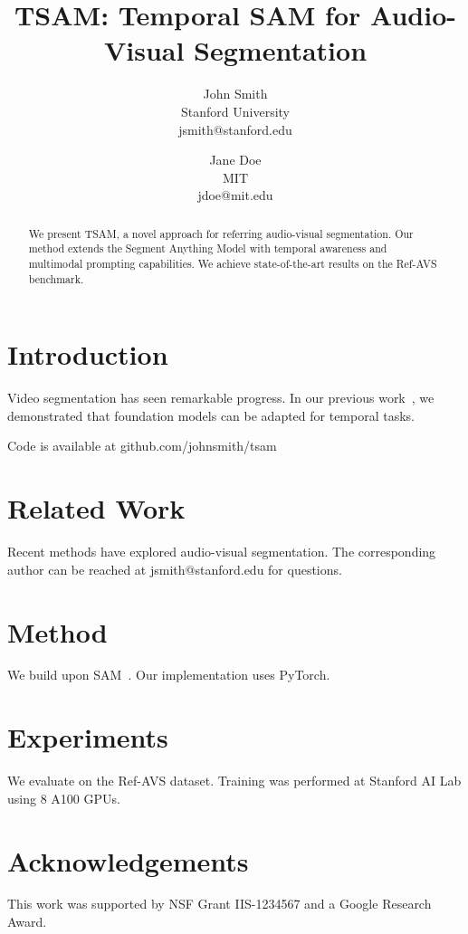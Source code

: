 \documentclass[10pt,twocolumn,letterpaper]{article}
\begin{document}
\title{TSAM: Temporal SAM for Audio-Visual Segmentation}

\author{John Smith\\
Stanford University\\
jsmith@stanford.edu
\and
Jane Doe\\
MIT\\
jdoe@mit.edu
}

\maketitle

\begin{abstract}
We present TSAM, a novel approach for referring audio-visual segmentation. Our method extends the Segment Anything Model with temporal awareness and multimodal prompting capabilities. We achieve state-of-the-art results on the Ref-AVS benchmark.
\end{abstract}

\section{Introduction}

Video segmentation has seen remarkable progress. In our previous work~\cite{smith2024}, we demonstrated that foundation models can be adapted for temporal tasks.

Code is available at github.com/johnsmith/tsam

\section{Related Work}

Recent methods have explored audio-visual segmentation. The corresponding author can be reached at jsmith@stanford.edu for questions.

\section{Method}

We build upon SAM~\cite{kirillov2023sam}. Our implementation uses PyTorch.

\section{Experiments}

We evaluate on the Ref-AVS dataset. Training was performed at Stanford AI Lab using 8 A100 GPUs.

\section*{Acknowledgements}
This work was supported by NSF Grant IIS-1234567 and a Google Research Award.



\end{document}
